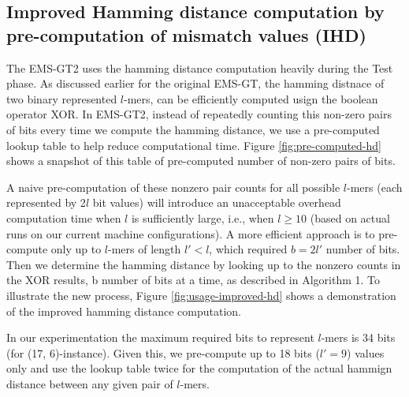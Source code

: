 \subsection{Improved Hamming distance computation by pre-computation of mismatch values (IHD)}
The EMS-GT2 uses the hamming distance computation heavily during the Test phase. As discussed earlier for the original EMS-GT, the hamming distnace of two binary represented $l$-mers, can be efficiently computed usign the boolean operator XOR. In EMS-GT2, instead of repeatedly counting this non-zero pairs of bits every time we compute the hamming distance, we use a pre-computed lookup table to help reduce computational time. Figure \ref{fig:pre-computed-hd} shows a snapshot of this table of pre-computed number of non-zero pairs of bits.



A naive pre-computation of these nonzero pair counts for all possible $l$-mers (each represented by 2$l$ bit values) will introduce an unacceptable overhead computation time when $l$ is sufficiently large, i.e., when $l \geq 10$ (based on actual runs on our current machine configurations). A more efficient approach is to pre-compute only up to $l$-mers of length $l' < l$, which required $b = 2l'$ number of bits. Then we determine the hamming distance by looking up to the nonzero counts in the XOR results, b number of bits at a time, as described in Algorithm 1. To illustrate the new process, Figure \ref{fig:usage-improved-hd} shows a demonstration of the improved hamming distance computation.

 



In our experimentation the maximum required bits to represent $l$-mers is 34 bits (for (17, 6)-instance). Given this, we pre-compute up to 18 bits ($l' = 9$) values only and use the lookup table twice for the computation of the actual hammign distance between any given pair of $l$-mers.







